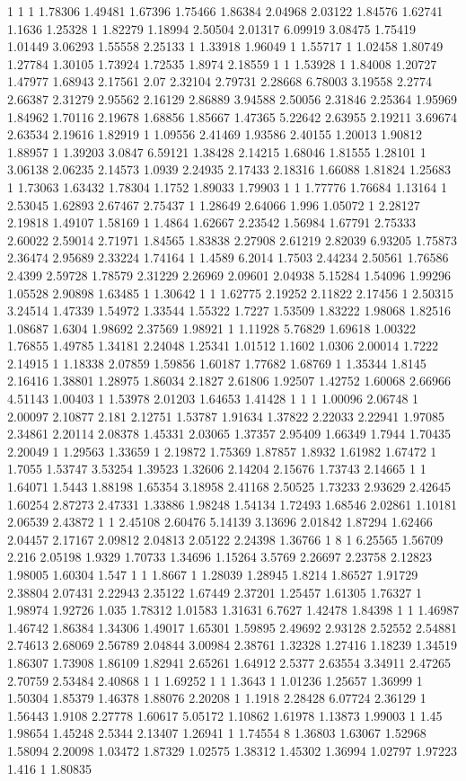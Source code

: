 1 1 1 1.78306 1.49481 1.67396 1.75466 1.86384 2.04968 2.03122 1.84576 1.62741 1.1636 1.25328 1 1.82279 1.18994 2.50504 2.01317 6.09919 3.08475 1.75419 1.01449 3.06293 1.55558 2.25133 1 1.33918 1.96049 1 1.55717 1 1.02458 1.80749 1.27784 1.30105 1.73924 1.72535 1.8974 2.18559 1 1 1.53928 1 1.84008 1.20727 1.47977 1.68943 2.17561 2.07 2.32104 2.79731 2.28668 6.78003 3.19558 2.2774 2.66387 2.31279 2.95562 2.16129 2.86889 3.94588 2.50056 2.31846 2.25364 1.95969 1.84962 1.70116 2.19678 1.68856 1.85667 1.47365 5.22642 2.63955 2.19211 3.69674 2.63534 2.19616 1.82919 1 1.09556 2.41469 1.93586 2.40155 1.20013 1.90812 1.88957 1 1.39203 3.0847 6.59121 1.38428 2.14215 1.68046 1.81555 1.28101 1 3.06138 2.06235 2.14573 1.0939 2.24935 2.17433 2.18316 1.66088 1.81824 1.25683 1 1.73063 1.63432 1.78304 1.1752 1.89033 1.79903 1 1 1.77776 1.76684 1.13164 1 2.53045 1.62893 2.67467 2.75437 1 1.28649 2.64066 1.996 1.05072 1 2.28127 2.19818 1.49107 1.58169 1 1.4864 1.62667 2.23542 1.56984 1.67791 2.75333 2.60022 2.59014 2.71971 1.84565 1.83838 2.27908 2.61219 2.82039 6.93205 1.75873 2.36474 2.95689 2.33224 1.74164 1 1.4589 6.2014 1.7503 2.44234 2.50561 1.76586 2.4399 2.59728 1.78579 2.31229 2.26969 2.09601 2.04938 5.15284 1.54096 1.99296 1.05528 2.90898 1.63485 1 1.30642 1 1 1.62775 2.19252 2.11822 2.17456 1 2.50315 3.24514 1.47339 1.54972 1.33544 1.55322 1.7227 1.53509 1.83222 1.98068 1.82516 1.08687 1.6304 1.98692 2.37569 1.98921 1 1.11928 5.76829 1.69618 1.00322 1.76855 1.49785 1.34181 2.24048 1.25341 1.01512 1.1602 1.0306 2.00014 1.7222 2.14915 1 1.18338 2.07859 1.59856 1.60187 1.77682 1.68769 1 1.35344 1.8145 2.16416 1.38801 1.28975 1.86034 2.1827 2.61806 1.92507 1.42752 1.60068 2.66966 4.51143 1.00403 1 1.53978 2.01203 1.64653 1.41428 1 1 1 1.00096 2.06748 1 2.00097 2.10877 2.181 2.12751 1.53787 1.91634 1.37822 2.22033 2.22941 1.97085 2.34861 2.20114 2.08378 1.45331 2.03065 1.37357 2.95409 1.66349 1.7944 1.70435 2.20049 1 1.29563 1.33659 1 2.19872 1.75369 1.87857 1.8932 1.61982 1.67472 1 1.7055 1.53747 3.53254 1.39523 1.32606 2.14204 2.15676 1.73743 2.14665 1 1 1.64071 1.5443 1.88198 1.65354 3.18958 2.41168 2.50525 1.73233 2.93629 2.42645 1.60254 2.87273 2.47331 1.33886 1.98248 1.54134 1.72493 1.68546 2.02861 1.10181 2.06539 2.43872 1 1 2.45108 2.60476 5.14139 3.13696 2.01842 1.87294 1.62466 2.04457 2.17167 2.09812 2.04813 2.05122 2.24398 1.36766 1 8 1 6.25565 1.56709 2.216 2.05198 1.9329 1.70733 1.34696 1.15264 3.5769 2.26697 2.23758 2.12823 1.98005 1.60304 1.547 1 1 1.8667 1 1.28039 1.28945 1.8214 1.86527 1.91729 2.38804 2.07431 2.22943 2.35122 1.67449 2.37201 1.25457 1.61305 1.76327 1 1.98974 1.92726 1.035 1.78312 1.01583 1.31631 6.7627 1.42478 1.84398 1 1 1.46987 1.46742 1.86384 1.34306 1.49017 1.65301 1.59895 2.49692 2.93128 2.52552 2.54881 2.74613 2.68069 2.56789 2.04844 3.00984 2.38761 1.32328 1.27416 1.18239 1.34519 1.86307 1.73908 1.86109 1.82941 2.65261 1.64912 2.5377 2.63554 3.34911 2.47265 2.70759 2.53484 2.40868 1 1 1.69252 1 1 1.3643 1 1.01236 1.25657 1.36999 1 1.50304 1.85379 1.46378 1.88076 2.20208 1 1.1918 2.28428 6.07724 2.36129 1 1.56443 1.9108 2.27778 1.60617 5.05172 1.10862 1.61978 1.13873 1.99003 1 1.45 1.98654 1.45248 2.5344 2.13407 1.26941 1 1.74554 8 1.36803 1.63067 1.52968 1.58094 2.20098 1.03472 1.87329 1.02575 1.38312 1.45302 1.36994 1.02797 1.97223 1.416 1 1.80835 